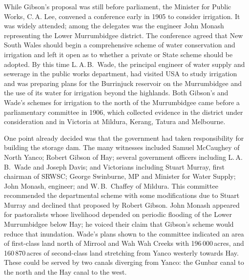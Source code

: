 While Gibson's proposal was still before parliament, the Minister for
Public Works, C.\,A. Lee,  convened a conference
early in 1905 to consider irrigation.  It was widely attended; among
the delegates was the engineer John Monash
representing the Lower Murrumbidgee
district.  The conference agreed that New South Wales should begin a
comprehensive scheme of water conservation and irrigation and left it
open as to whether a private or State scheme should be adopted.  By
this time L.\,A.\,B.~Wade, the principal
engineer of water supply and sewerage in the public works department,
had visited USA to study irrigation and was preparing plans
for the Burrinjuck reservoir
 on the Murrumbidgee and the use of its
water for irrigation beyond the highlands.  Both Gibson's and Wade's
schemes for irrigation to the north of the Murrumbidgee came before a
parliamentary committee in 1906, which collected evidence in the
district under consideration and in Victoria at Mildura, Kerang,
Tatura and Melbourne.

One point already decided was that the government had taken
responsibility for building the storage dam.
The many witnesses included Samuel McCaughey of North Yanco; Robert
Gibson of Hay; several government officers including L.\,A.\,B.~Wade
and Joseph Davis; and Victorians including Stuart Murray, first
chairman of SRWSC; George Swinburne, MP and Minister for Water Supply;
John Monash, engineer; and W.\,B.~Chaffey of Mildura. This committee
recommended the departmental scheme with some modifications due to
Stuart Murray and declined that proposed by Robert Gibson.  John
Monash appeared for pastoralists whose livelihood depended on periodic
flooding of the Lower Murrumbidgee below Hay; he voiced
their claim that Gibson's scheme would reduce that inundation.  Wade's
plans shown to the committee indicated an area of first-class land
north of Mirrool and Wah Wah Creeks with 196\,000\,acres, and
160\,870\,acres of second-class land stretching from Yanco westerly
towards Hay. These could be served by two
canals diverging from Yanco: the Gunbar canal
 to the north and the Hay canal 
to the west.

